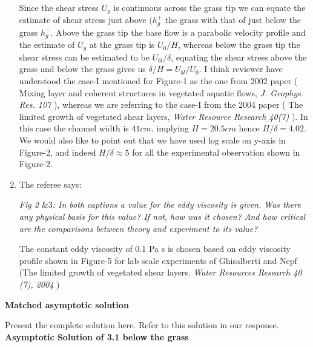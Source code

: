 \documentclass[letterpaper,10pt]{article}
\begin{document}
\begin{enumerate}
Since the shear stress $U_y$ is continuous across the grass tip we can equate the estimate of shear stress just above $(h_g^+$ the grass with that of just below the grass $h_g^{-}$. 
Above the grass tip the base flow is a parabolic velocity profile and the estimate of $U_y$ at the grass tip is $U_0/H$, whereas below the grass tip the shear stress can be estimated to be $U_{bl}/\delta$, equating the shear stress above the grass and below the grass gives us $\delta/H = U_{bl}/U_0$.
I think reviewer have understood the case-I mentioned for Figure-1 as the one from 2002 paper ( Mixing layer and coherent structures in vegetated aquatic flows, \textit{J. Geophys. Res. 107} ), whereas we are referring to the case-I from the 2004 paper ( The limited growth of vegetated shear layers, \textit{Water Resource Research 40(7)} ). In this case the channel width is $41cm$, implying $H=20.5 cm$ hence $H/\delta=4.02$. We would also like to point out that we have used log scale on y-axis in Figure-2, and indeed $H/\delta \approx 5$ for all the experimental observation shown in Figure-2.


\item The referee says:

\textit{  Fig 2 $\& 3$:
In both captions a value for the eddy viscosity is given. Was there any
physical basis for this value? If not, how was it chosen? And how critical
are the comparisons between theory and experiment to its value?
}

The constant eddy viscosity of 0.1 Pa s is chosen based on eddy viscosity profile shown in Figure-5 for lab scale experiments of Ghisalberti and Nepf (The limited growth of vegetated shear layers. \textit{Water Resources Research 40 (7), 2004} )



\end{enumerate}

\newpage
\centerline{\textbf{Matched asymptotic solution}}
Present the complete solution here. Refer to this solution in our response.
\textbf{Asymptotic Solution of 3.1 below the grass}
\end{document}
